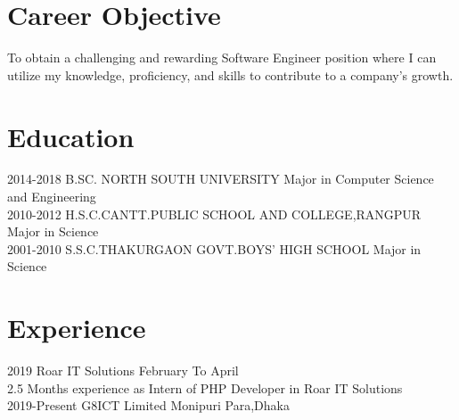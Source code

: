 \documentclass[]{cv-style}
\begin{document}
\section{Career Objective}
To obtain a challenging and rewarding Software Engineer position where I can utilize my knowledge, proficiency, and skills to contribute to a company's growth.
\section{Education}
\begin{entrylist}
  \entry
    {2014-2018} 
    {B.SC. NORTH SOUTH UNIVERSITY}
    {Major in Computer Science and Engineering}
    {}
  \\
  \entry
    {2010-2012}
    {H.S.C.CANTT.PUBLIC SCHOOL AND COLLEGE,RANGPUR}
    {Major in Science}
    {}
    \\
  \entry
    {2001-2010}
    {S.S.C.THAKURGAON GOVT.BOYS' HIGH SCHOOL}
    {Major in Science}
    {}
  
\end{entrylist}
\section{Experience}
\begin{entrylist}
\entry
  {2019}
  {Roar IT Solutions}
  {February To April}
  {\\
  2.5 Months experience as Intern of PHP Developer in Roar IT Solutions}
  \\
\entry
  {2019-Present}
  {G8ICT Limited}
  {Monipuri Para,Dhaka}
  {}
\end{entrylist}

\end{document}

